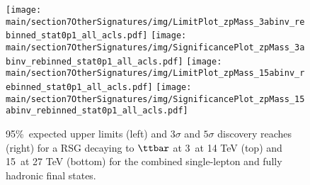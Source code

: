 \begin{figure}[t]
  \centering
    \texttt{[image: \\main/section7OtherSignatures/img/LimitPlot\_zpMass\_3abinv\_rebinned\_stat0p1\_all\_acls.pdf]}
    \texttt{[image: \\main/section7OtherSignatures/img/SignificancePlot\_zpMass\_3abinv\_rebinned\_stat0p1\_all\_acls.pdf]}
    \texttt{[image: \\main/section7OtherSignatures/img/LimitPlot\_zpMass\_15abinv\_rebinned\_stat0p1\_all\_acls.pdf]}
    \texttt{[image: \\main/section7OtherSignatures/img/SignificancePlot\_zpMass\_15abinv\_rebinned\_stat0p1\_all\_acls.pdf]}
    \caption{95\%~\cl expected upper limits (left) and $3\sigma$ and $5\sigma$ discovery reaches (right) for a RSG decaying to $\ttbar$ at 3~\abinv at 14 TeV (top) and 15~\abinv at 27 TeV (bottom) for the combined single-lepton and fully hadronic final states.}
    \label{fig:rsg:results}
\end{figure}
